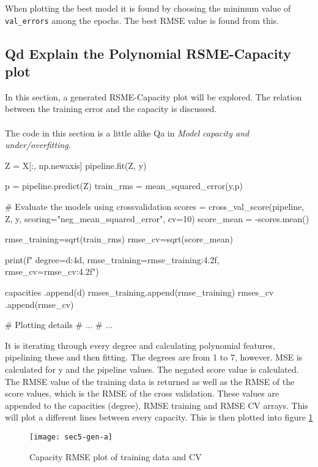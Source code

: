 \documentclass{article}
\begin{document}
When plotting the best model it is found by choosing the minimum value of \texttt{val\_errors} among the epochs. The best RMSE value is found from this.


\subsection{Qd Explain the Polynomial RSME-Capacity plot}

In this section, a generated RSME-Capacity plot will be explored. The relation between the training error and the capacity is discussed.
\\ \\

The code in this section is a little alike Qa in \textit{Model capacity and under/overfitting}.

\begin{pyminted}
Z = X[:, np.newaxis]
pipeline.fit(Z, y)

p = pipeline.predict(Z)
train_rms = mean_squared_error(y,p)

# Evaluate the models using crossvalidation
scores = cross_val_score(pipeline, Z, y, scoring="neg_mean_squared_error", cv=10)
score_mean = -scores.mean()

rmse_training=sqrt(train_rms)
rmse_cv=sqrt(score_mean)

print(f"  degree={d:4d}, rmse_training={rmse_training:4.2f}, rmse_cv={rmse_cv:4.2f}")

capacities    .append(d)
rmses_training.append(rmse_training)
rmses_cv      .append(rmse_cv)

# Plotting details 
# ... 
# ...
\end{pyminted}

It is iterating through every degree and calculating polynomial features, pipelining these and then fitting. The degrees are from 1 to 7, however.  MSE is calculated for y and the pipeline values. The negated score value is  calculated. The RMSE value of the training data is returned as well as the RMSE of the score values, which is the RMSE of the cross validation. These values are appended to the capacities (degree), RMSE training and RMSE CV arrays. This will plot a different lines between every capacity. This is then plotted into figure \ref{fig:gen_a} 

\begin{figure}[H]
  \centering
    \texttt{[image: sec5-gen-a]}
    \caption{Capacity RMSE plot of training data and CV}
    \label{fig:gen_a}
\end{figure}
\end{document}
